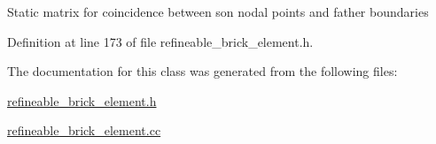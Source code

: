 Static matrix for coincidence between son nodal points and father boundaries 

Definition at line 173 of file refineable\+\_\+brick\+\_\+element.\+h.



The documentation for this class was generated from the following files\+:\begin{DoxyCompactItemize}
\item 
\hyperlink{refineable__brick__element_8h}{refineable\+\_\+brick\+\_\+element.\+h}\item 
\hyperlink{refineable__brick__element_8cc}{refineable\+\_\+brick\+\_\+element.\+cc}\end{DoxyCompactItemize}
